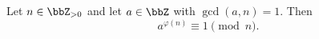 \begin{theorem} \label{theorem:eulers_theorem}
    Let $n \in \bbZ_{>0}$ and let $a \in \bbZ$ with $\gcd(a, n) = 1$. Then
    $$a^{\varphi(n)} \equiv 1 \pmod{n}.$$
\end{theorem}
